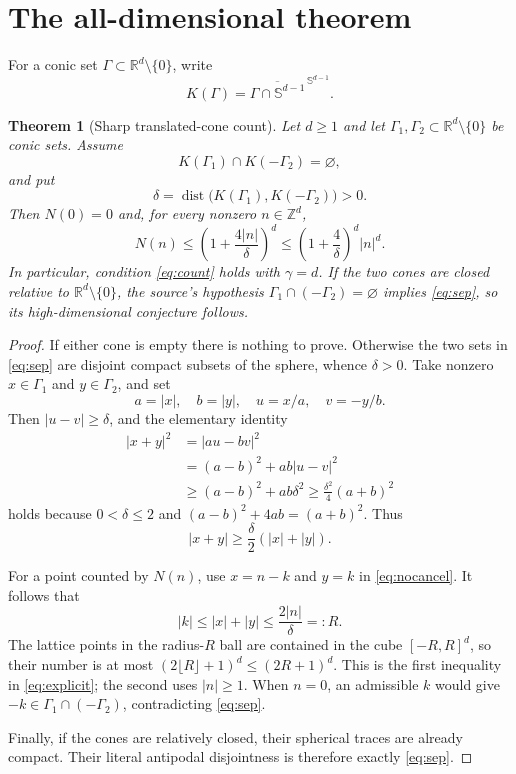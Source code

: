 \documentclass[11pt]{article}
\newtheorem{theorem}{Theorem}
\newcommand{\R}{\mathbb R}
\newcommand{\Z}{\mathbb Z}
\newcommand{\Sph}{\mathbb S^{d-1}}
\newcommand{\dist}{\operatorname{dist}}
\begin{document}
\section{The all-dimensional theorem}

For a conic set $\Gamma\subset\R^d\setminus\{0\}$, write
\[
 K(\Gamma)=\overline{\Gamma\cap\Sph}^{\,\Sph}.
\]

\begin{theorem}[Sharp translated-cone count]\label{thm:main}
Let $d\ge1$ and let $\Gamma_1,\Gamma_2\subset\R^d\setminus\{0\}$ be
conic sets.  Assume
\begin{equation}\label{eq:sep}
 K(\Gamma_1)\cap K(-\Gamma_2)=\varnothing,
\end{equation}
and put
\[
 \delta=\dist\bigl(K(\Gamma_1),K(-\Gamma_2)\bigr)>0.
\]
Then $N(0)=0$ and, for every nonzero $n\in\Z^d$,
\begin{equation}\label{eq:explicit}
 N(n)\le \left(1+\frac{4|n|}{\delta}\right)^d
 \le \left(1+\frac4\delta\right)^d|n|^d.
\end{equation}
In particular, condition \eqref{eq:count} holds with $\gamma=d$.
If the two cones are closed relative to $\R^d\setminus\{0\}$, the source's
hypothesis $\Gamma_1\cap(-\Gamma_2)=\varnothing$ implies
\eqref{eq:sep}, so its high-dimensional conjecture follows.
\end{theorem}

\begin{proof}
If either cone is empty there is nothing to prove.  Otherwise the two sets in
\eqref{eq:sep} are disjoint compact subsets of the sphere, whence $\delta>0$.
Take nonzero $x\in\Gamma_1$ and $y\in\Gamma_2$, and set
\[
 a=|x|,\quad b=|y|,\quad u=x/a,\quad v=-y/b.
\]
Then $|u-v|\ge\delta$, and the elementary identity
\begin{align*}
 |x+y|^2
 &=|au-bv|^2\\
 &=(a-b)^2+ab|u-v|^2\\
 &\ge (a-b)^2+ab\delta^2
 \ge \frac{\delta^2}{4}(a+b)^2
\end{align*}
holds because $0<\delta\le2$ and
$(a-b)^2+4ab=(a+b)^2$.  Thus
\begin{equation}\label{eq:nocancel}
 |x+y|\ge\frac\delta2(|x|+|y|).
\end{equation}

For a point counted by $N(n)$, use $x=n-k$ and $y=k$ in
\eqref{eq:nocancel}.  It follows that
\[
 |k|\le |x|+|y|\le\frac{2|n|}{\delta}=:R.
\]
The lattice points in the radius-$R$ ball are contained in the cube
$[-R,R]^d$, so their number is at most
$(2\lfloor R\rfloor+1)^d\le(2R+1)^d$.  This is the first inequality in
\eqref{eq:explicit}; the second uses $|n|\ge1$.  When $n=0$, an admissible
$k$ would give $-k\in\Gamma_1\cap(-\Gamma_2)$, contradicting
\eqref{eq:sep}.

Finally, if the cones are relatively closed, their spherical traces are
already compact.  Their literal antipodal disjointness is therefore exactly
\eqref{eq:sep}.
\end{proof}
\end{document}
